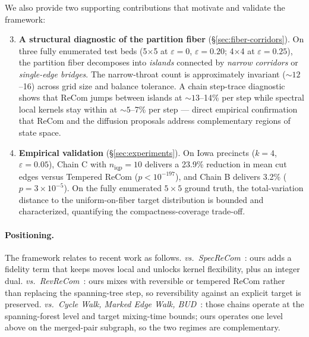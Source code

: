 \documentclass[11pt]{article}
\begin{document}
\noindent We also provide two supporting contributions that motivate
and validate the framework:

\begin{enumerate}\setcounter{enumi}{2}
  \item \textbf{A structural diagnostic of the partition fiber}
    (\S\ref{sec:fiber-corridors}). On three fully enumerated test beds
    (5$\times$5 at $\varepsilon = 0$, $\varepsilon = 0.20$; 4$\times$4
    at $\varepsilon = 0.25$), the partition fiber decomposes into
    \emph{islands} connected by \emph{narrow corridors} or
    \emph{single-edge bridges}. The narrow-throat count is
    approximately invariant ($\sim 12$--16) across grid size and
    balance tolerance. A chain step-trace diagnostic shows that
    ReCom jumps between islands at $\sim 13$--14\% per step while
    spectral local kernels stay within at $\sim 5$--7\% per step ---
    direct empirical confirmation that ReCom and the diffusion
    proposals address complementary regions of state space.

  \item \textbf{Empirical validation} (\S\ref{sec:experiments}). On
    Iowa precincts ($k = 4$, $\varepsilon = 0.05$), Chain C with
    $n_{\mathrm{iqp}} = 10$ delivers a 23.9\% reduction in mean cut
    edges versus Tempered ReCom ($p < 10^{-197}$), and Chain B
    delivers 3.2\% ($p = 3 \times 10^{-5}$). On the fully enumerated
    $5 \times 5$ ground truth, the total-variation distance to the
    uniform-on-fiber target distribution is bounded and characterized,
    quantifying the compactness-coverage trade-off.
\end{enumerate}

\paragraph{Positioning.} The framework relates to recent work as
follows. \emph{vs.\ SpecReCom}~\cite{davies2025spectral}: ours adds a
fidelity term that keeps moves local and unlocks kernel flexibility,
plus an integer dual. \emph{vs.\ RevReCom}~\cite{cannon2022spanning}:
ours mixes with reversible or tempered ReCom rather than replacing
the spanning-tree step, so reversibility against an explicit target
is preserved. \emph{vs.\ Cycle Walk, Marked Edge Walk,
BUD}~\cite{deford2025cycle, mcwhorter2025marked, akitaya2026bud}:
those chains operate at the spanning-forest level and target
mixing-time bounds; ours operates one level above on the merged-pair
subgraph, so the two regimes are complementary.
\end{document}
